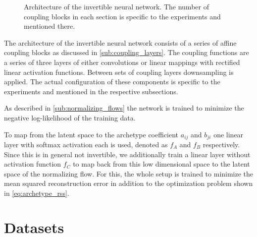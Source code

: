 \begin{figure}[htpb]
\begin{center}
\begin{subfigure}[]{0.45\textwidth}
\begin{center}
			\end{center}
		\end{subfigure}
	\end{center}
	\caption{Architecture of the invertible neural network. The number of
		coupling blocks in each section is specific to the experiments and
		mentioned there.}%
	\label{fig:inn_contents}
\end{figure}

The architecture of the invertible neural network consists of a series of
affine coupling blocks as discussed in \autoref{sub:coupling_layers}. The
coupling functions are a series of three layers of either convolutions or
linear mappings with rectified linear activation functions. Between sets of
coupling layers downsampling is applied. The actual configuration of these
components is specific to the experiments and mentioned in the respective
subsections.

As described in \autoref{sub:normalizing_flows} the network is trained to
minimize the negative log-likelihood of the training data.

To map from the latent space to the archetype coefficient $a_{ij}$ and $b_{ji}$
one linear layer with softmax activation each is used, denoted as $f_A$ and
$f_B$ respectively. Since this is in general not invertible, we additionally
train a linear layer without activation function $f_C$ to map back from this
low dimensional space to the latent space of the normalizing flow. For this,
the whole setup is trained to minimize the mean squared reconstruction error in
addition to the optimization problem shown in \autoref{eq:archetype_rss}.


\section{Datasets}%
\label{sec:datasets}

